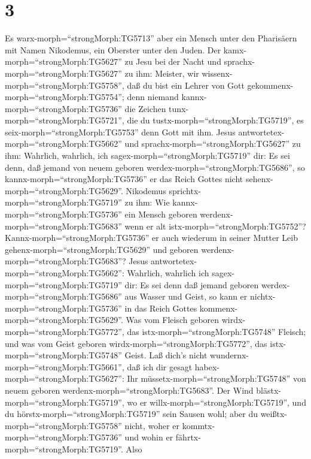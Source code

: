 \hypertarget{section-2}{%
\section{3}\label{section-2}}

 Es warx-morph=``strongMorph:TG5713'' aber ein Mensch unter
den Pharisäern mit Namen Nikodemus, ein Oberster unter den Juden.
 Der kamx-morph=``strongMorph:TG5627'' zu Jesu bei der Nacht
und sprachx-morph=``strongMorph:TG5627'' zu ihm: Meister, wir
wissenx-morph=``strongMorph:TG5758'', daß du bist ein Lehrer von Gott
gekommenx-morph=``strongMorph:TG5754''; denn niemand
kannx-morph=``strongMorph:TG5736'' die Zeichen
tunx-morph=``strongMorph:TG5721'', die du
tustx-morph=``strongMorph:TG5719'', es seix-morph=``strongMorph:TG5753''
denn Gott mit ihm.  Jesus
antwortetex-morph=``strongMorph:TG5662'' und
sprachx-morph=``strongMorph:TG5627'' zu ihm: Wahrlich, wahrlich, ich
sagex-morph=``strongMorph:TG5719'' dir: Es sei denn, daß jemand von
neuem geboren werdex-morph=``strongMorph:TG5686'', so
kannx-morph=``strongMorph:TG5736'' er das Reich Gottes nicht
sehenx-morph=``strongMorph:TG5629''.  Nikodemus
sprichtx-morph=``strongMorph:TG5719'' zu ihm: Wie
kannx-morph=``strongMorph:TG5736'' ein Mensch geboren
werdenx-morph=``strongMorph:TG5683'' wenn er alt
istx-morph=``strongMorph:TG5752''? Kannx-morph=``strongMorph:TG5736'' er
auch wiederum in seiner Mutter Leib gehenx-morph=``strongMorph:TG5629''
und geboren werdenx-morph=``strongMorph:TG5683''?  Jesus
antwortetex-morph=``strongMorph:TG5662'': Wahrlich, wahrlich ich
sagex-morph=``strongMorph:TG5719'' dir: Es sei denn daß jemand geboren
werdex-morph=``strongMorph:TG5686'' aus Wasser und Geist, so kann er
nichtx-morph=``strongMorph:TG5736'' in das Reich Gottes
kommenx-morph=``strongMorph:TG5629''.  Was vom Fleisch
geboren wirdx-morph=``strongMorph:TG5772'', das
istx-morph=``strongMorph:TG5748'' Fleisch; und was vom Geist geboren
wirdx-morph=``strongMorph:TG5772'', das
istx-morph=``strongMorph:TG5748'' Geist.  Laß dich's nicht
wundernx-morph=``strongMorph:TG5661'', daß ich dir gesagt
habex-morph=``strongMorph:TG5627'': Ihr
müssetx-morph=``strongMorph:TG5748'' von neuem geboren
werdenx-morph=``strongMorph:TG5683''.  Der Wind
blästx-morph=``strongMorph:TG5719'', wo er
willx-morph=``strongMorph:TG5719'', und du
hörstx-morph=``strongMorph:TG5719'' sein Sausen wohl; aber du
weißtx-morph=``strongMorph:TG5758'' nicht, woher er
kommtx-morph=``strongMorph:TG5736'' und wohin er
fährtx-morph=``strongMorph:TG5719''. Also
